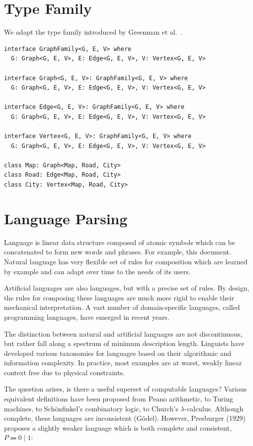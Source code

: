 \documentclass[sigplan,10pt,review,anonymous]{acmart}
\begin{document}
\section{Type Family}

We adapt the type family introduced by Greenman et al.~\citep{greenman2014getting}.

\begin{lstlisting}
interface GraphFamily<G, E, V> where
  G: Graph<G, E, V>, E: Edge<G, E, V>, V: Vertex<G, E, V>

interface Graph<G, E, V>: GraphFamily<G, E, V> where
  G: Graph<G, E, V>, E: Edge<G, E, V>, V: Vertex<G, E, V>

interface Edge<G, E, V>: GraphFamily<G, E, V> where
  G: Graph<G, E, V>, E: Edge<G, E, V>, V: Vertex<G, E, V>

interface Vertex<G, E, V>: GraphFamily<G, E, V> where
  G: Graph<G, E, V>, E: Edge<G, E, V>, V: Vertex<G, E, V>

class Map: Graph<Map, Road, City>
class Road: Edge<Map, Road, City>
class City: Vertex<Map, Road, City>
\end{lstlisting}

\section{Language Parsing}

Language is linear data structure composed of atomic symbols which can be concatenated to form new words and phrases. For example, this document. Natural language has very flexible set of rules for composition which are learned by example and can adapt over time to the needs of its users.

Artificial languages are also languages, but with a precise set of rules. By design, the rules for composing these languages are much more rigid to enable their mechanical interpretation. A vast number of domain-specific languages, called programming languages, have emerged in recent years.

The distinction between natural and artificial languages are not discontinuous, but rather fall along a spectrum of minimum description length. Linguists have developed various taxonomies for languages based on their algorithmic and information complexity. In practice, most examples are at worst, weakly linear context free due to physical constraints.

The question arises, is there a useful superset of computable languages? Various equivalent definitions have been proposed from Peano arithmetic, to Turing machines, to Sch\"onfinkel's combinatory logic, to Church's $\lambda$-calculus. Although complete, these languages are inconsistent (G\"odel). However, Presburger (1929) proposes a slightly weaker language which is both complete and consistent, $P \Coloneqq 0 \mid 1$:
\end{document}
